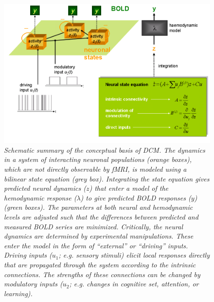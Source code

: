 \begin{figure}[ht]
\begin{center}
\includegraphics[width=130mm]{dcm/Fig2}
\caption{\em Schematic summary of the conceptual basis of DCM.  The dynamics in a system of interacting neuronal populations (orange boxes), which are not directly observable by fMRI, is modeled using a bilinear state equation (grey box).  Integrating the state equation gives predicted neural dynamics ($z$) that enter a model of the hemodynamic response ($\lambda$) to give predicted BOLD responses ($y$) (green boxes).  The parameters at both neural and hemodynamic levels are adjusted such that the differences between predicted and measured BOLD series are minimized.  Critically, the neural dynamics are determined by experimental manipulations.  These enter the model in the form of ``external'' or ``driving'' inputs.  Driving inputs ($u_1$; e.g. sensory stimuli) elicit local responses directly that are propagated through the system according to the intrinsic connections.  The strengths of these connections can be changed by modulatory inputs ($u_2$; e.g. changes in cognitive set, attention, or learning).\label{fig2}}
\end{center}
\end{figure}

